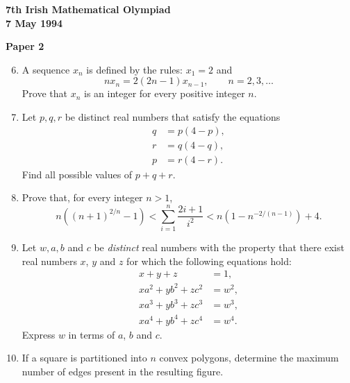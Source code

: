 \documentclass[12pt]{article}
\begin{document}
\newpage
\begin{center}
{\large\bfseries 7th Irish Mathematical Olympiad\\7 May 1994}
\end{center}
\bigskip\noindent\textbf{Paper 2}\bigskip
\begin{enumerate}
\setcounter{enumi}{5}
\item A sequence $x_n$ is defined by the rules: $x_1 = 2$ and
\[nx_n = 2(2n-1)x_{n-1}, \qquad n = 2, 3, \ldots\]
Prove that $x_n$ is an integer for every positive integer $n$.

\item Let $p, q, r$ be distinct real numbers that satisfy the equations
\begin{align*}
q &= p(4-p),\\
r &= q(4-q),\\
p &= r(4-r).
\end{align*}
Find all possible values of $p + q + r$.

\item Prove that, for every integer $n > 1$,
\[n\left((n+1)^{2/n} - 1\right) < \sum_{i=1}^{n} \frac{2i+1}{i^2} < n\left(1 - n^{-2/(n-1)}\right) + 4.\]

\item Let $w, a, b$ and $c$ be \emph{distinct} real numbers with the property that there exist real numbers $x$, $y$ and $z$ for which the following equations hold:
\begin{align*}
x + y + z &= 1,\\
xa^2 + yb^2 + zc^2 &= w^2,\\
xa^3 + yb^3 + zc^3 &= w^3,\\
xa^4 + yb^4 + zc^4 &= w^4.
\end{align*}
Express $w$ in terms of $a$, $b$ and $c$.

\item If a square is partitioned into $n$ convex polygons, determine the maximum number of edges present in the resulting figure.
\end{enumerate}
\end{document}
